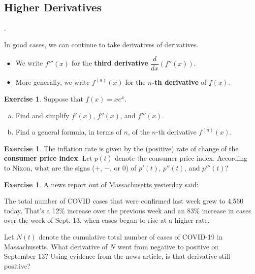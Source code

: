 \documentclass[11pt,reqno,final]{amsart}
\numberwithin{figure}{section}
\theoremstyle{definition} %
\newtheorem{exercise}[question]{Exercise}
\begin{document}
\subsection{Higher Derivatives}.

In good cases, we can continue to take derivatives of derivatives.
\begin{itemize}
\item We write $f'''(x)$ for the \textbf{third derivative} $\dfrac{d}{dx}(f''(x))$.
\item More generally, we write $f^{(n)}(x)$ for the \textbf{$n$-th derivative} of $f(x)$.
\end{itemize}

\begin{exercise}
        Suppose that $f(x) = xe^x$.
        \begin{enumerate}[(a)]
        \item Find and simplify $f'(x)$, $f''(x)$, and $f'''(x)$.
                \vfill
        \item Find a general formula, in terms of $n$, of the $n$-th derivative $f^{(n)}(x)$.
                \vfill
        \end{enumerate}
\end{exercise}


\begin{exercise}
        The inflation rate is given by the (positive) rate of change of the \textbf{consumer price index}.
        Let $p(t)$ denote the consumer price index.
        According to Nixon, what are the signs ($+$, $-$, or 0) of $p'(t)$, $p''(t)$, and $p'''(t)$?\\[10pt]
\end{exercise}

\begin{exercise}
        A news report out of Massachusetts yesterday said:
        \begin{displayquote}
                The total number of COVID cases that were confirmed last week grew to 4,560 today.
                That's a 12\% increase over the previous week
                and an 83\% increase in cases over the week of Sept. 13, when cases began to rise at a higher rate.        
        \end{displayquote}
        Let $N(t)$ denote the cumulative total number of cases of COVID-19 in Massachusetts.
        What derivative of $N$ went from negative to positive on September 13?
        Using evidence from the news article, is that derivative still positive?
        \vfill
\end{exercise}
\end{document}
